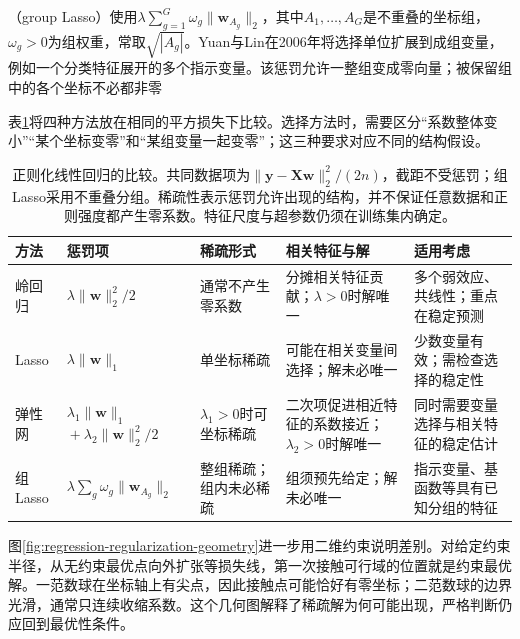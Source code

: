 （group Lasso）使用$\lambda\sum_{g=1}^{G}\omega_g\lVert\bm{w}_{A_g}\rVert_2$，其中$A_1,\ldots,A_G$是不重叠的坐标组，$\omega_g>0$为组权重，常取$\sqrt{|A_g|}$。Yuan与Lin在2006年将选择单位扩展到成组变量，例如一个分类特征展开的多个指示变量。该惩罚允许一整组变成零向量；被保留组中的各个坐标不必都非零

表\ref{tab:regression-regularization-comparison}将四种方法放在相同的平方损失下比较。选择方法时，需要区分“系数整体变小”“某个坐标变零”和“某组变量一起变零”；这三种要求对应不同的结构假设。

\begin{table}[t]
  \centering
  \small
  \setlength{\tabcolsep}{4pt}
  \renewcommand{\arraystretch}{1.25}
  \begin{tabularx}{\linewidth}{@{}>{\RaggedRight\arraybackslash}p{16mm}>{\RaggedRight\arraybackslash}p{42mm}>{\RaggedRight\arraybackslash}p{24mm}>{\RaggedRight\arraybackslash}p{34mm}>{\RaggedRight\arraybackslash}X@{}}
    \toprule
    方法 & 惩罚项 & 稀疏形式 & 相关特征与解 & 适用考虑 \\
    \midrule
    岭回归 & $\lambda\lVert\bm{w}\rVert_2^2/2$ & 通常不产生零系数 & 分摊相关特征贡献；$\lambda>0$时解唯一 & 多个弱效应、共线性；重点在稳定预测 \\
    \addlinespace
    Lasso & $\lambda\lVert\bm{w}\rVert_1$ & 单坐标稀疏 & 可能在相关变量间选择；解未必唯一 & 少数变量有效；需检查选择的稳定性 \\
    \addlinespace
    弹性网 & $\lambda_1\lVert\bm{w}\rVert_1$\newline ${}+\lambda_2\lVert\bm{w}\rVert_2^2/2$ & $\lambda_1>0$时可坐标稀疏 & 二次项促进相近特征的系数接近；$\lambda_2>0$时解唯一 & 同时需要变量选择与相关特征的稳定估计 \\
    \addlinespace
    组Lasso & $\lambda\sum_g\omega_g\lVert\bm{w}_{A_g}\rVert_2$ & 整组稀疏；组内未必稀疏 & 组须预先给定；解未必唯一 & 指示变量、基函数等具有已知分组的特征 \\
    \bottomrule
  \end{tabularx}
  \caption{正则化线性回归的比较。共同数据项为$\lVert\bm{y}-\bm{X}\bm{w}\rVert_2^2/(2n)$，截距不受惩罚；组Lasso采用不重叠分组。稀疏性表示惩罚允许出现的结构，并不保证任意数据和正则强度都产生零系数。特征尺度与超参数仍须在训练集内确定。}
  \label{tab:regression-regularization-comparison}
\end{table}

图\ref{fig:regression-regularization-geometry}进一步用二维约束说明差别。对给定约束半径，从无约束最优点向外扩张等损失线，第一次接触可行域的位置就是约束最优解。一范数球在坐标轴上有尖点，因此接触点可能恰好有零坐标；二范数球的边界光滑，通常只连续收缩系数。这个几何图解释了稀疏解为何可能出现，严格判断仍应回到最优性条件。

